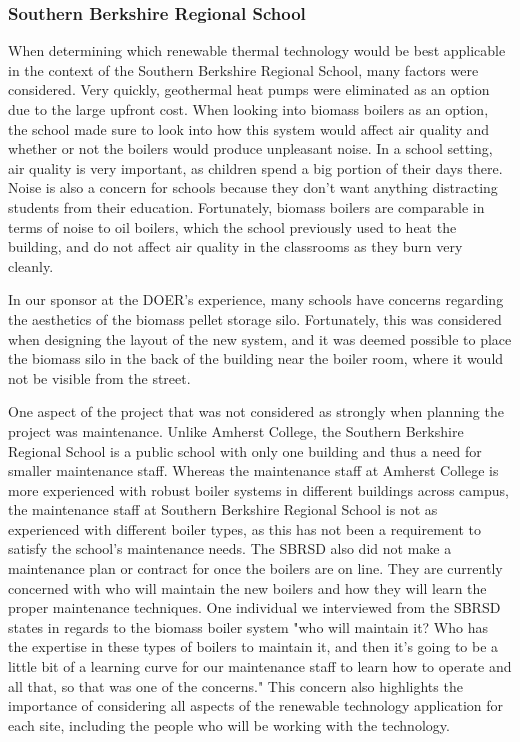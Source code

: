 \subsubsection{Southern Berkshire Regional School}
\par When determining which renewable thermal technology would be best applicable in the context of the Southern Berkshire Regional School, many factors were considered. Very quickly, geothermal heat pumps were eliminated as an option due to the large upfront cost. When looking into biomass boilers as an option, the school made sure to look into how this system would affect air quality and whether or not the boilers would produce unpleasant noise. In a school setting, air quality is very important, as children spend a big portion of their days there. Noise is also a concern for schools because they don't want anything distracting students from their education. Fortunately, biomass boilers are comparable in terms of noise to oil boilers, which the school previously used to heat the building, and do not affect air quality in the classrooms as they burn very cleanly.
\par In our sponsor at the DOER's experience, many schools have concerns regarding the aesthetics of the biomass pellet storage silo. Fortunately, this was considered when designing the layout of the new system, and it was deemed possible to place the biomass silo in the back of the building near the boiler room, where it would not be visible from the street.
\par One aspect of the project that was not considered as strongly when planning the project was maintenance. Unlike Amherst College, the Southern Berkshire Regional School is a public school with only one building and thus a need for smaller maintenance staff. Whereas the maintenance staff at Amherst College is more experienced with robust boiler systems in different buildings across campus, the maintenance staff at Southern Berkshire Regional School is not as experienced with different boiler types, as this has not been a requirement to satisfy the school's maintenance needs. The SBRSD also did not make a maintenance plan or contract for once the boilers are on line. They are currently concerned with who will maintain the new boilers and how they will learn the proper maintenance techniques. One individual we interviewed from the SBRSD states in regards to the biomass boiler system "who will maintain it? Who has the expertise in these types of boilers to maintain it, and then it's going to be a little bit of a learning curve for our maintenance staff to learn how to operate and all that, so that was one of the concerns." This concern also highlights the importance of considering all aspects of the renewable technology application for each site, including the people who will be working with the technology.

